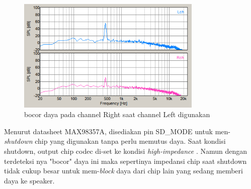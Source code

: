 \documentclass[12pt,]{article}
\begin{document}
	\begin{figure}[!ht]
		\centering
		\includegraphics[width=250pt]{hasil/test/left_miniso}
		\caption{bocor daya pada channel Right saat channel Left digunakan}
	\end{figure}

	Menurut datasheet MAX98357A, disediakan pin SD\_MODE untuk men-\textit{shutdown} chip yang digunakan tanpa perlu memutus daya.
	Saat kondisi shutdown, output chip codec di-set ke kondisi \textit{high-impedance} \cite{Maxim}.
	Namun dengan terdeteksi nya "bocor" daya ini maka sepertinya impedansi chip saat shutdown tidak cukup besar untuk mem-\textit{block} daya
	dari chip lain yang sedang memberi daya ke speaker.
	
\end{document}
